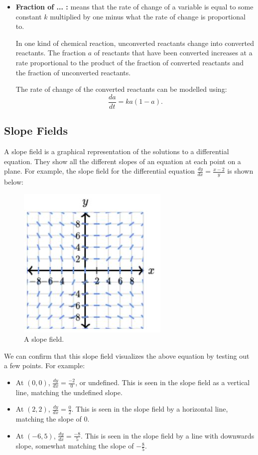 \begin{itemize}
	\item \textbf{Fraction of ... :} means that the rate of change of a variable is equal to some constant $k$ multiplied by one minus what the rate of change is proportional to.

	In one kind of chemical reaction, unconverted reactants change into converted reactants. The fraction $a$ of reactants that have been converted increases at a rate proportional to the product of the fraction of converted reactants and the fraction of unconverted reactants.

	The rate of change of the converted reactants can be modelled using:
	\[ \frac{da}{dt} = ka(1 - a). \]
\end{itemize}

\subsection{Slope Fields}
A slope field is a graphical representation of the solutions to a differential equation. They show all the different slopes of an equation at each point on a plane. For example, the slope field for the differential equation $\frac{dy}{dx} = \frac{x - 2}{y}$ is shown below:
\begin{figure}[H]
	\centering
	\includegraphics{images/fig13.JPG}
	\caption{A slope field.}
\end{figure}

We can confirm that this slope field visualizes the above equation by testing out a few points. For example:
\begin{itemize}
	\item At $(0, 0)$, $\frac{dy}{dx} = \frac{-2}{0}$, or undefined. This is seen in the slope field as a vertical line, matching the undefined slope.
	\item At $(2, 2)$, $\frac{dy}{dx} = \frac{0}{2}$. This is seen in the slope field by a horizontal line, matching the slope of $0$.
	\item At $(-6, 5)$, $\frac{dy}{dx} = \frac{-8}{5}$. This is seen in the slope field by a line with downwards slope, somewhat matching the slope of $-\frac{8}{5}$.
\end{itemize}

